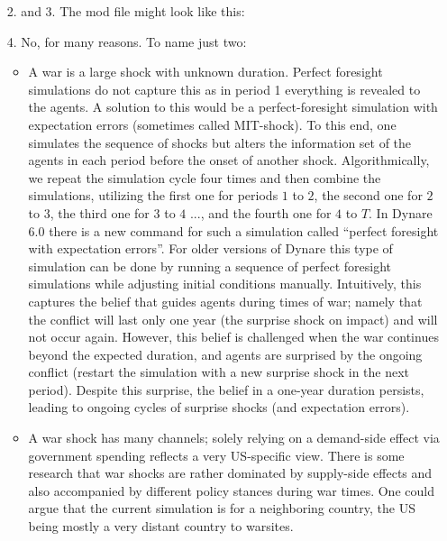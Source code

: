 \begin{enumerate}
\item[2. and 3.] The mod file might look like this:

\item[4.] No, for many reasons. To name just two:
\begin{itemize}
    \item A war is a large shock with unknown duration.
    Perfect foresight simulations do not capture this as in period 1 everything is revealed to the agents.
    A solution to this would be a perfect-foresight simulation with expectation errors (sometimes called MIT-shock).
    To this end, one simulates the sequence of shocks but alters the information set of the agents in each period before the onset of another shock.
    Algorithmically, we repeat the simulation cycle four times and then combine the simulations,
      utilizing the first one for periods $1$ to $2$, the second one for $2$ to $3$, the third one for $3$ to $4$ ..., and the fourth one for $4$ to $T$.
    In Dynare 6.0 there is a new command for such a simulation called ``perfect foresight with expectation errors''.
    For older versions of Dynare this type of simulation can be done by running a sequence of perfect foresight simulations while adjusting initial conditions manually.
    Intuitively, this captures the belief that guides agents during times of war;
      namely that the conflict will last only one year (the surprise shock on impact) and will not occur again.
    However, this belief is challenged when the war continues beyond the expected duration,
      and agents are surprised by the ongoing conflict (restart the simulation with a new surprise shock in the next period).
    Despite this surprise, the belief in a one-year duration persists, leading to ongoing cycles of surprise shocks (and expectation errors).
    \item A war shock has many channels; solely relying on a demand-side effect via government spending reflects a very US-specific view.
    There is some research that war shocks are rather dominated by supply-side effects
      and also accompanied by different policy stances during war times.
    One could argue that the current simulation is for a neighboring country,
      the US being mostly a very distant country to warsites.
\end{itemize}
\end{enumerate}
